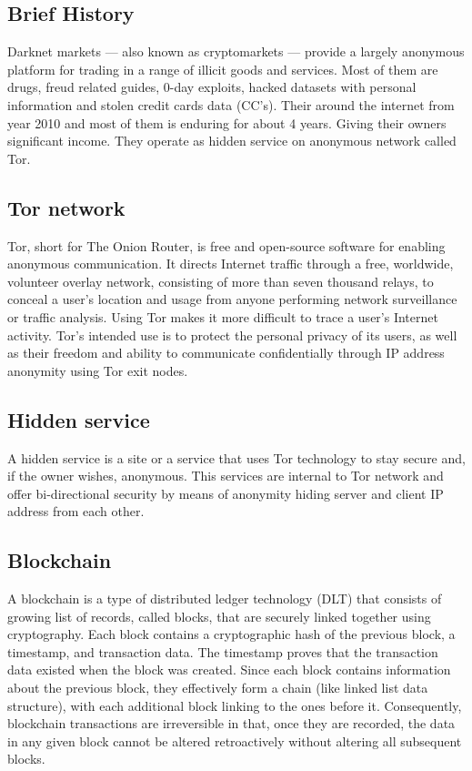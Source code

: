 \documentclass[journal]{IEEEtran} %
\begin{document}
    \subsection{Brief History}
    Darknet markets — also known as cryptomarkets — provide a largely anonymous platform for trading in a range of illicit goods and services. Most of them are drugs, freud related guides, 0-day exploits, hacked datasets with personal information and stolen credit cards data (CC's). Their around the internet from year 2010 and most of them is enduring for about 4 years. Giving their owners significant income. They operate as hidden service on anonymous network called Tor.

    \subsection{Tor network}
    Tor, short for The Onion Router, is free and open-source software for enabling anonymous communication. It directs Internet traffic through a free, worldwide, volunteer overlay network, consisting of more than seven thousand relays, to conceal a user's location and usage from anyone performing network surveillance or traffic analysis. Using Tor makes it more difficult to trace a user's Internet activity. Tor's intended use is to protect the personal privacy of its users, as well as their freedom and ability to communicate confidentially through IP address anonymity using Tor exit nodes.\\

    \subsection{Hidden service}
    A hidden service is a site or a service that uses Tor technology to stay secure and, if the owner wishes, anonymous. This services are internal to Tor network and offer bi-directional security by means of anonymity hiding server and client IP address from each other.\\

    \subsection{Blockchain}
    A blockchain is a type of distributed ledger technology (DLT) that consists of growing list of records, called blocks, that are securely linked together using cryptography. Each block contains a cryptographic hash of the previous block, a timestamp, and transaction data. The timestamp proves that the transaction data existed when the block was created. Since each block contains information about the previous block, they effectively form a chain (like linked list data structure), with each additional block linking to the ones before it. Consequently, blockchain transactions are irreversible in that, once they are recorded, the data in any given block cannot be altered retroactively without altering all subsequent blocks.\\
\end{document}
